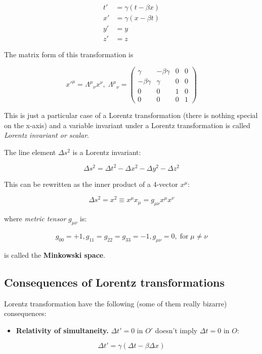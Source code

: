 \documentclass[
  letterpaper,
  DIV=11,
  numbers=noendperiod]{scrreprt}
\providecommand{\tightlist}{%
  \setlength{\itemsep}{0pt}\setlength{\parskip}{0pt}}\usepackage{longtable,booktabs,array}
\begin{document}
\[\begin{aligned}
t' &= \gamma(t - \beta x) \\
x' &= \gamma(x - \beta t) \\
y' &= y \\
z' &= z
\end{aligned}\]

The matrix form of this transformation is

\[x'^\mu = {\Lambda^\mu}_\nu x^\nu, \; {\Lambda^\mu}_\nu =
\begin{pmatrix}
\gamma & -\beta\gamma & 0 & 0 \\
-\beta\gamma & \gamma & 0 & 0 \\
0 & 0 & 1 & 0 \\
0 & 0 & 0 & 1
\end{pmatrix}\]

This is just a particular case of a Lorentz transformation (there is
nothing special on the x-axis) and a variable invariant under a Lorentz
transformation is called \emph{Lorentz invariant or scalar}.

The line element \(\Delta s^2\) is a Lorentz invariant:

\[\Delta s^2 = \Delta t^2 - \Delta x^2 - \Delta y^2 -\Delta z^2 \]

This can be rewritten as the inner product of a 4-vector \(x^{\mu}\):

\[\Delta s^2 = x^2 \equiv x^\mu x_\mu = g_{\mu\nu} x^\mu x^\nu\]

where \emph{metric tensor} \(g_{\mu\nu}\) is:

\[g_{00} = + 1, g_{11} = g_{22} = g_{33} = - 1 , g_{\mu\nu} = 0, \;\mathrm{ for}\; \mu \neq\nu\]

is called the \textbf{Minkowski space}.

\subsection{Consequences of Lorentz
transformations}\label{consequences-of-lorentz-transformations}

Lorentz transformation have the following (some of them really bizarre)
consequences:

\begin{itemize}
\tightlist
\item
  \textbf{Relativity of simultaneity.} \(\Delta t' = 0\) in \(O'\)
  doesn't imply \(\Delta t = 0\) in \(O\):
\end{itemize}

\[\Delta t' = \gamma(\Delta t - \beta \Delta x)\]
\end{document}
